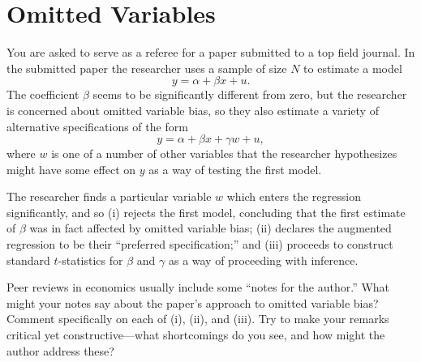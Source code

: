 \documentclass[12pt]{amsart}
\begin{document}
\section{Omitted Variables}
\label{sec:org2df7c01}
You are asked to serve as a referee for a paper submitted to a top
field journal.  In the submitted paper the researcher uses a sample
of size \(N\) to estimate a model
\[
     y = \alpha + \beta x + u.
  \]
The coefficient \(\beta\) seems to be significantly different from
zero, but the researcher is concerned about omitted variable bias,
so they also estimate a variety of alternative specifications of the form
\[
     y = \alpha + \beta x + \gamma w + u,
  \]
where \(w\) is one of a number of other variables that the researcher
hypothesizes might have some effect on \(y\) as a way of testing the
first model.

The researcher finds a particular variable \(w\) which enters the
regression significantly, and so (i) rejects the first model,
concluding that the first estimate of \(\beta\) was in fact affected by
omitted variable bias; (ii) declares the augmented regression to be
their ``preferred specification;'' and (iii) proceeds to construct
standard \(t\)-statistics for \(\beta\) and \(\gamma\) as a way of
proceeding with inference.

Peer reviews in economics usually include some ``notes for the
author.''  What might your notes say about the paper's approach to
omitted variable bias?  Comment specifically on each of (i), (ii),
and (iii).  Try to make your remarks critical yet
constructive---what shortcomings do you see, and how might the
author address these?
\end{document}
